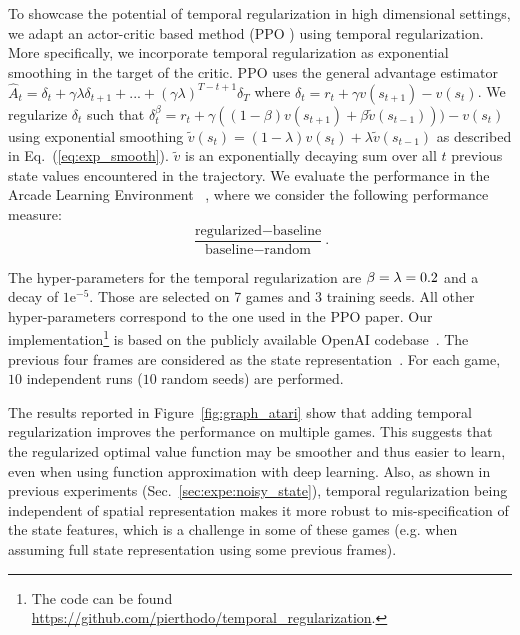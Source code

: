 To showcase the potential of temporal regularization in high dimensional settings, we adapt an actor-critic based method (PPO \cite{schulman2017proximal}) using temporal regularization. More specifically, we incorporate temporal regularization as exponential smoothing in the target of the critic.  PPO uses the general advantage estimator $\hat{A}_t = \delta_t + \gamma \lambda \delta_{t+1} + ... + (\gamma \lambda)^{T-t+1} \delta_{T}$ where $\delta_t = r_t + \gamma v(s_{t+1}) - v(s_{t})$. We regularize $\delta_t$ such that $\delta_t^{\beta} = r_t + \gamma ((1-\beta)v(s_{t+1}) + \beta \widetilde{v}(s_{t-1}))) - v(s_{t})$ using exponential smoothing $\widetilde{v}(s_{t}) = (1-\lambda)v(s_t) + \lambda \widetilde{v}(s_{t-1})$ as described in Eq.~(\ref{eq:exp_smooth}). $\widetilde{v}$ is an exponentially decaying sum over all $t$ previous state values encountered in the trajectory.
We evaluate the performance in the Arcade Learning Environment ~\cite{bellemare2013arcade}, where we consider the following performance measure:
\begin{equation}
\label{eqn:expe:drl_measure}
    \frac{\text{regularized} - \text{baseline}}{\text{baseline} - \text{random}}.
\end{equation}

The hyper-parameters for the temporal regularization are $\beta = \lambda = 0.2$ and a decay of $1\mathrm{e}^{-5}$. Those are selected on 7 games and 3 training seeds. All other hyper-parameters correspond to the one used in the PPO paper. Our implementation\footnote{The code can be found \url{https://github.com/pierthodo/temporal_regularization}.} is based on the publicly available OpenAI codebase~\cite{baselines}. The previous four frames are considered as the state representation~\cite{mnih2015human}.
For each game, $10$ independent runs ($10$ random seeds) are performed. 


The results reported in Figure~\ref{fig:graph_atari} show that adding temporal regularization improves the performance on multiple games. This suggests that the regularized optimal value function may be smoother and thus easier to learn, even when using function approximation with deep learning. Also, as shown in previous experiments (Sec.~\ref{sec:expe:noisy_state}), temporal regularization being independent of spatial representation makes it more robust to mis-specification of the state features, which is a challenge in some of these games (e.g. when assuming full state representation using some previous frames).

